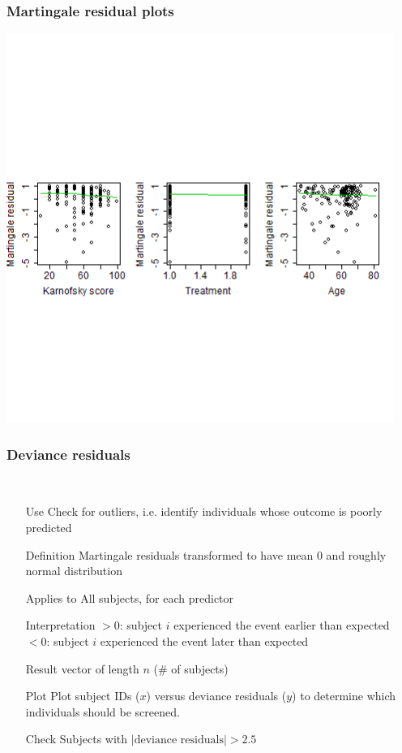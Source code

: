 \begin{frame}
\frametitle{Martingale residual plots}
\includegraphics[width=0.95\textwidth, clip, trim={0 5cm 0cm 5cm}]{Figures/martingale_residuals.png}
\vskip100pt
\end{frame}


\begin{frame}
\frametitle{Deviance residuals}
\hspace*{-0.3in}
\begin{minipage}{0.12\textwidth}
\textcolor{white}{w}
\end{minipage}
\begin{minipage}{0.91\textwidth}
\small{
\begin{itemize}
\item[Use] Check for outliers, i.e. identify individuals whose outcome is poorly predicted
\item[Definition] Martingale residuals transformed to have mean 0 and roughly normal distribution
\item[Applies to] All subjects, for each predictor
\item[Interpretation] $>0$: subject $i$ experienced the event earlier than expected \\
                      $<0$: subject $i$ experienced the event later than expected
\item[Result] vector of length $n$ (\# of subjects)
\item[Plot] Plot subject IDs ($x$) versus deviance residuals ($y$) to determine which individuals should be screened.
\item[Check] Subjects with $|\mbox{deviance residuals}|>2.5$
\end{itemize}}
\end{minipage}
\end{frame}

